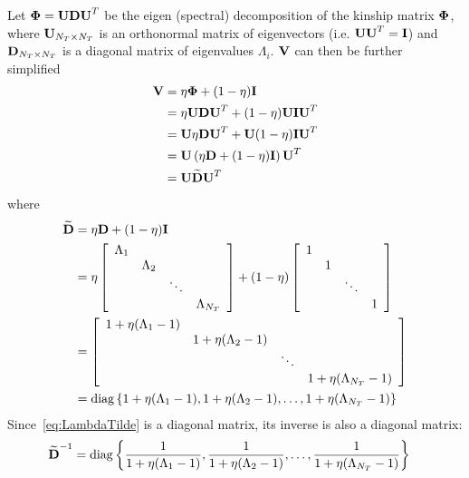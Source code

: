 Let $\boldsymbol{\Phi} = \textbf{U} \textbf{D} \textbf{U}^T$ be the eigen (spectral) decomposition of the kinship matrix $\boldsymbol{\Phi}$, where $\textbf{U}_{N_T \times N_T}$ is an orthonormal matrix of eigenvectors (i.e. $\textbf{U} \textbf{U}^T = \textbf{I}$) and $\textbf{D}_{N_T \times N_T}$ is a diagonal matrix of eigenvalues $\Lambda_i$. $\textbf{V}$ can then be further simplified~\citep{pirinen2013efficient}
\begin{align}
\textbf{V} & = \eta \boldsymbol{\Phi} + (1-\eta) \textbf{I} \nonumber \\
& = \eta \textbf{U} \textbf{D} \textbf{U}^T + (1-\eta) \textbf{U} \textbf{I} \textbf{U}^T \nonumber \\
& = \textbf{U} \eta  \textbf{D} \textbf{U}^T + \textbf{U} (1-\eta) \textbf{I} \textbf{U}^T \nonumber \\
& = \textbf{U} \left(\eta  \textbf{D} + (1-\eta) \textbf{I}\right) \textbf{U}^T \nonumber \\
& = \textbf{U} \widetilde{\textbf{D}} \textbf{U}^T  \label{eq:Vsimplified}
\end{align}
where
\begin{align}
\widetilde{\bD} & = \eta  \bD + (1-\eta) \bI  \label{eq:LambdaTilde} \\
& =  \eta \left[ \begin{array}{cccc}
\Lambda_1 & \hfill & \hfill & \hfill  \\
\hfill & \Lambda_2 & \hfill & \hfill  \\
\hfill & \hfill & \ddots &\hfill  \\
\hfill & \hfill & \hfill & \Lambda_{N_T}  \\
\end{array} \right] + (1-\eta) \left[ \begin{array}{cccc}
1 & \hfill & \hfill & \hfill  \\
\hfill & 1 & \hfill & \hfill  \\
\hfill & \hfill & \ddots &\hfill  \\
\hfill & \hfill & \hfill & 1  \\
\end{array} \right]  \nonumber \\
& =   \left[ \begin{array}{cccc}
1 + \eta (\Lambda_1-1) & \hfill & \hfill & \hfill  \\
\hfill & 1 + \eta (\Lambda_2-1) & \hfill & \hfill  \\
\hfill & \hfill & \ddots &\hfill  \\
\hfill & \hfill & \hfill & 1 + \eta (\Lambda_{N_T}-1)  \\
\end{array} \right]   \nonumber \\
& = \diag\left\lbrace 1 + \eta (\Lambda_1-1), 1 + \eta (\Lambda_2-1), \ldots, 1 + \eta (\Lambda_{N_T}-1) \label{eq:DiagLambda} \right\rbrace
\end{align}
Since~\eqref{eq:LambdaTilde} is a diagonal matrix, its inverse is also a diagonal matrix:
\begin{align}
\widetilde{\textbf{D}}^{-1} & = \operatorname{diag}\left\lbrace \frac{1}{1 + \eta (\Lambda_1-1)}, \frac{1}{1 + \eta (\Lambda_2-1)}, \ldots, \frac{1}{1 + \eta (\Lambda_{N_T}-1)} \label{eq:DiagInvLambda} \right\rbrace
\end{align}


